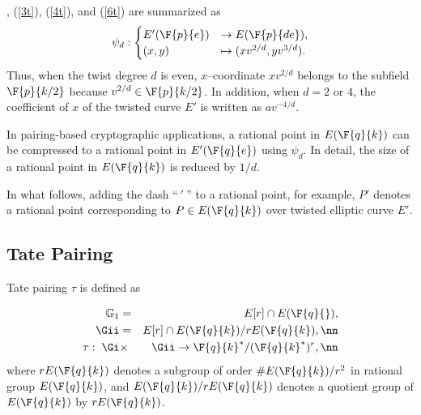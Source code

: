 
, (\ref{3t}), (\ref{4t}), and (\ref{6t}) are summarized as
\begin{eqnarray}
\psi_d : 
\begin{cases}
E'(\F{p}{e}) & \rightarrow  E(\F{p}{de}), \\
(x,y) & \mapsto (xv^{2/d},yv^{3/d}).
\end{cases} \label{gt}
\end{eqnarray}
Thus, when the twist degree $d$ is even, $x$--coordinate $xv^{2/d}$ belongs to the subfield $\F{p}{k/2}$ because $v^{2/d}\in \F{p}{k/2}$. In addition, when $d=2$ or $4$, the coefficient of $x$ of the twisted curve $E'$ is written as $av^{-4/d}$.

In pairing-based cryptographic applications, a rational point in $E(\F{q}{k})$ can be compressed to a rational point in $E'(\F{q}{e})$ using $\psi_d$.
In detail, the size of a rational point in $E(\F{q}{k})$ is reduced by $1/d$.

In what follows, adding the dash ``$\ '\ $'' to a rational point, for example, $P'$ denotes a rational point corresponding to $P \in E(\F{q}{k})$ over twisted elliptic curve $E'$.


\subsection{Tate Pairing}
Tate pairing $\tau$ is defined as 

\begin{eqnarray}
\mathbb{G}_1 &=& E[r]\cap E(\F{q}{}), \nonumber \\
\Gii &=& E[r]\cap E(\F{q}{k})/rE(\F{q}{k}), \nn \\
\tau:\;\Gi &\times& \Gii \rightarrow \F{q}{k}^*/(\F{q}{k}^*)^r, \nn
\end{eqnarray}
where $rE(\F{q}{k})$ denotes a subgroup of order $\#E(\F{q}{k})/r^2$ in rational group $E(\F{q}{k})$, and $E(\F{q}{k})/rE(\F{q}{k})$ denotes a quotient group of $E(\F{q}{k})$ by $rE(\F{q}{k})$.

